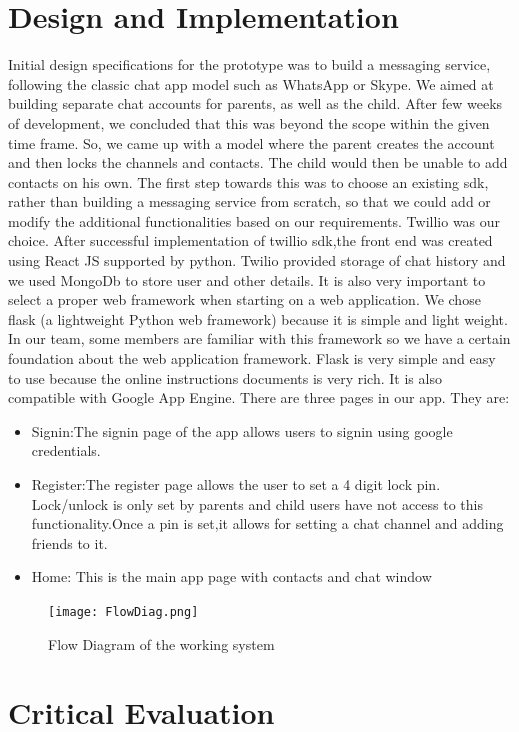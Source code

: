 \documentclass[a4paper,10pt]{article}
\begin{document}
\section{Design and Implementation}
Initial design specifications for the prototype was to build a messaging service, following the classic chat app model such as WhatsApp or Skype. We aimed at building separate chat accounts for parents, as well as the child. After few weeks of development, we concluded that this was beyond the scope within  the given time frame. So, we came up with a model where the parent creates the account and then locks the channels and contacts. The child would then be unable to add contacts on his own.
The first step towards this was to choose an existing sdk, rather than building a messaging service from scratch, so that we could add or modify the additional functionalities based on our requirements. Twillio was our choice. After successful implementation of twillio sdk,the front end was created using React JS supported by python.  Twilio provided storage of chat history and we used 	MongoDb to store user and other details.  It is also very important to select a proper web framework when starting on a web application. We chose flask (a lightweight Python web framework) because it is simple and light weight. In our team, some members are familiar with this framework  so we have a certain foundation about the web application framework.
Flask is very simple and easy to use because the online instructions documents is very rich. It is also compatible with Google App Engine.
\newline
There are three pages in our app. They are:
\begin{itemize}
\item Signin:The signin page of the app allows users to signin using google credentials.
\item Register:The register page allows the user to set a 4 digit lock pin.  Lock/unlock is only set by parents and child users have not access to this functionality.Once a pin is set,it allows for setting a chat channel and adding friends to it.
\item Home: This is the main app page with contacts and chat window
\end{itemize}
\begin{figure}[h]
\centering
\texttt{[image: FlowDiag.png]}
\caption{\label{}Flow Diagram of the working system}
\end{figure}
\newpage
\section{Critical Evaluation}
\end{document}
